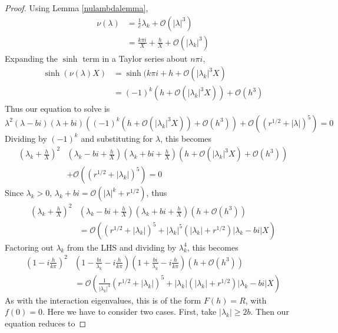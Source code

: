 \documentclass[thesis.tex]{subfiles}
\begin{document}
\begin{lemma}
\begin{proof}
Using Lemma \ref{nulambdalemma},
\begin{align*}
\nu(\lambda) &= \frac{1}{c}\lambda_k + \mathcal{O}(|\lambda|^3) \\
&= \frac{k \pi i}{X} + \frac{h}{X} + \mathcal{O}(|\lambda_k|^3)
\end{align*}
Expanding the $\sinh$ term in a Taylor series about $n \pi i$,
\begin{align*}
\sinh(\nu(\lambda)X) &= \sinh(k \pi i + h + \mathcal{O}(|\lambda_k|^3 X) \\
&= (-1)^k ( h + \mathcal{O}(|\lambda_k|^3 X)) + \mathcal{O}(h^3)
\end{align*}
Thus our equation to solve is
\begin{equation*}
\lambda^2 ( \lambda - b i) (\lambda + b i)((-1)^k ( h + \mathcal{O}(|\lambda_k|^3 X)) + \mathcal{O}(h^3)) + \mathcal{O}( (r^{1/2} + |\lambda|)^5 ) = 0
\end{equation*}
Dividing by $(-1)^k$ and substituting for $\lambda$, this becomes
\begin{align*}
\left(\lambda_k + \frac{h}{X}\right)^2 &\left(\lambda_k - b i + \frac{h}{X}\right)\left(\lambda_k + b i + \frac{h}{X}\right) ( h + \mathcal{O}(|\lambda_k|^3 X) + \mathcal{O}(h^3)) \\
&+ \mathcal{O}( (r^{1/2} + |\lambda_k|)^5 ) = 0
\end{align*}
Since $\lambda_k > 0$, $\lambda_k + b i = \mathcal{O}(|\lambda|^k + r^{1/2})$, thus 
\begin{align*}
\left(\lambda_k + \frac{h}{X}\right)^2 &\left(\lambda_k - b i + \frac{h}{X}\right)\left(\lambda_k + b i + \frac{h}{X}\right) ( h + \mathcal{O}(h^3)) \\
&= \mathcal{O}\left( (r^{1/2} + |\lambda_k|)^5 + |\lambda_k|^5 (|\lambda_k| + r^{1/2})|\lambda_k - b i|X \right)
\end{align*}
Factoring out $\lambda_k$ from the LHS and dividing by $\lambda_k^4$, this becomes
\begin{align*}
\left(1 - i \frac{h}{k \pi} \right)^2 &\left(1 - \frac{b i}{\lambda_k} - i \frac{h}{k \pi} \right)\left(1 + \frac{b i}{\lambda_k} - i \frac{h}{k \pi} \right) ( h + \mathcal{O}(h^3)) \\
&= \mathcal{O}\left( \frac{1}{|\lambda_k|^4} (r^{1/2} + |\lambda_k|)^5 + |\lambda_k| (|\lambda_k| + r^{1/2})|\lambda_k - b i|X \right)
\end{align*}
As with the interaction eigenvalues, this is of the form $F(h) = R$, with $f(0) = 0$. Here we have to consider two cases. First, take $|\lambda_k| \geq 2b$. Then our equation reduces to

\end{proof}
\end{lemma}
\end{document}
